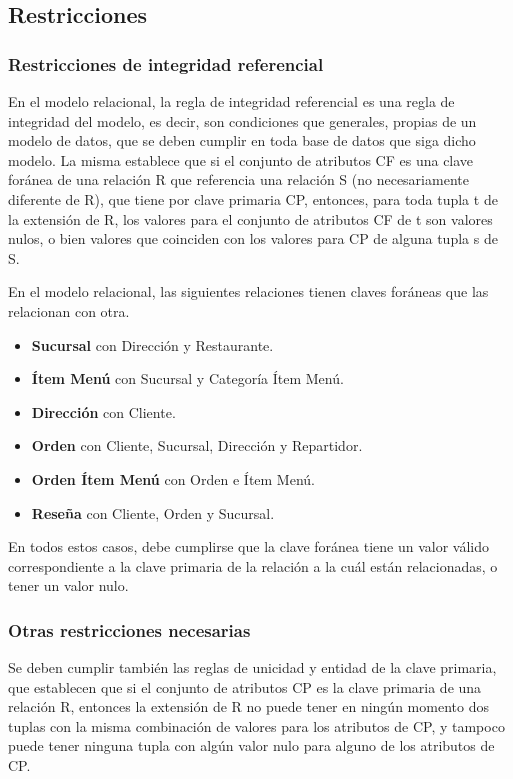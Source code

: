 \subsection{Restricciones}

\subsubsection{Restricciones de integridad referencial}

En el modelo relacional, la regla de integridad referencial es una regla de integridad del modelo, es decir, son condiciones que generales, propias de un modelo de datos, que se deben cumplir en toda base de datos que siga dicho modelo. La misma establece que si el conjunto de atributos CF es una clave foránea de una relación R que referencia una relación S (no necesariamente diferente de R), que tiene por clave primaria CP, entonces, para toda tupla t de la extensión de R, los valores para el conjunto de atributos CF de t son valores nulos, o bien valores que coinciden con los valores para CP de alguna tupla s de S.

En el modelo relacional, las siguientes relaciones tienen claves foráneas que las relacionan con otra.

\begin{itemize}
    \item \textbf{Sucursal} con Dirección y Restaurante.
    \item \textbf{Ítem Menú} con Sucursal y Categoría Ítem Menú.
    \item \textbf{Dirección} con Cliente.
    \item \textbf{Orden} con Cliente, Sucursal, Dirección y Repartidor.
    \item \textbf{Orden Ítem Menú} con Orden e Ítem Menú.
    \item \textbf{Reseña} con Cliente, Orden y Sucursal.
\end{itemize}

En todos estos casos, debe cumplirse que la clave foránea tiene un valor válido correspondiente a la clave primaria de la relación a la cuál están relacionadas, o tener un valor nulo.

\subsubsection{Otras restricciones necesarias}

Se deben cumplir también las reglas de unicidad y entidad de la clave primaria, que establecen que si el conjunto de atributos CP es la clave primaria de una relación R, entonces la extensión de R no puede tener en ningún momento dos tuplas con la misma combinación de valores para los atributos de CP, y tampoco puede tener ninguna tupla con algún valor nulo para alguno de los atributos de CP.

